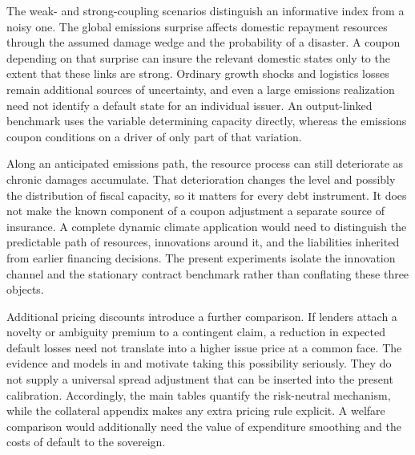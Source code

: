 The weak- and strong-coupling scenarios distinguish an informative index from a noisy one. The global emissions surprise affects domestic repayment resources through the assumed damage wedge and the probability of a disaster. A coupon depending on that surprise can insure the relevant domestic states only to the extent that these links are strong. Ordinary growth shocks and logistics losses remain additional sources of uncertainty, and even a large emissions realization need not identify a default state for an individual issuer. An output-linked benchmark uses the variable determining capacity directly, whereas the emissions coupon conditions on a driver of only part of that variation.

Along an anticipated emissions path, the resource process can still deteriorate as chronic damages accumulate. That deterioration changes the level and possibly the distribution of fiscal capacity, so it matters for every debt instrument. It does not make the known component of a coupon adjustment a separate source of insurance. A complete dynamic climate application would need to distinguish the predictable path of resources, innovations around it, and the liabilities inherited from earlier financing decisions. The present experiments isolate the innovation channel and the stationary contract benchmark rather than conflating these three objects.

Additional pricing discounts introduce a further comparison. If lenders attach a novelty or ambiguity premium to a contingent claim, a reduction in expected default losses need not translate into a higher issue price at a common face. The evidence and models in \textcite{igan2021_premia_scdi} and \textcite{RochRoldan2023} motivate taking this possibility seriously. They do not supply a universal spread adjustment that can be inserted into the present calibration. Accordingly, the main tables quantify the risk-neutral mechanism, while the collateral appendix makes any extra pricing rule explicit. A welfare comparison would additionally need the value of expenditure smoothing and the costs of default to the sovereign.
